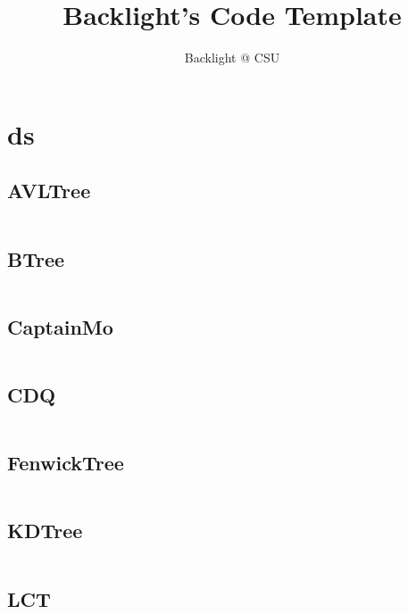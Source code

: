 \documentclass[a4]{article}
\title{\CJKfamily{hei} \bfseries Backlight's Code Template}
\author{Backlight @ CSU}
\begin{document}
\small
\begin{titlepage}
  \maketitle
\end{titlepage}

\newpage
\pagestyle{empty}
\renewcommand{\contentsname}{目录}
\tableofcontents
\newpage\clearpage
\newpage
\pagestyle{fancy}
\setcounter{page}{1}   %



\section{ds}
\subsection{AVLTree}
\inputminted[mathescape,linenos,numbersep=5pt,frame=lines,framesep=2mm]{cpp}{src/ds/AVLTree.cpp}
\subsection{BTree}
\inputminted[mathescape,linenos,numbersep=5pt,frame=lines,framesep=2mm]{cpp}{src/ds/BTree.cpp}
\subsection{CaptainMo}
\inputminted[mathescape,linenos,numbersep=5pt,frame=lines,framesep=2mm]{cpp}{src/ds/CaptainMo.cpp}
\subsection{CDQ}
\inputminted[mathescape,linenos,numbersep=5pt,frame=lines,framesep=2mm]{cpp}{src/ds/CDQ.cpp}
\subsection{FenwickTree}
\inputminted[mathescape,linenos,numbersep=5pt,frame=lines,framesep=2mm]{cpp}{src/ds/FenwickTree.cpp}
\subsection{KDTree}
\inputminted[mathescape,linenos,numbersep=5pt,frame=lines,framesep=2mm]{cpp}{src/ds/KDTree.cpp}
\subsection{LCT}
\inputminted[mathescape,linenos,numbersep=5pt,frame=lines,framesep=2mm]{cpp}{src/ds/LCT.cpp}
\end{document}
